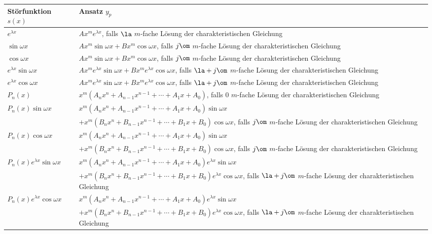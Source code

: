 \documentclass[a4paper]{article}
\begin{document}
\def\arraystretch{1.5}
\begin{tabular}{p{}|p{}}
\hline
St\"orfunktion $s(x)$ & Ansatz $y_p$ \\
\hline
$e^{\lambda x}$ & 
$Ax^me^{\lambda x}$, falls $\la$ $m$-fache L\"osung der charakteristischen Gleichung \\
$\sin \omega x$ & $Ax^m\sin \omega x+Bx^m\cos\omega x$, falls $j\om$ $m$-fache L\"osung der charakteristischen Gleichung \\
$\cos \omega x$ & $Ax^m\sin \omega x+Bx^m\cos\omega x$, falls $j\om$ $m$-fache L\"osung der charakteristischen Gleichung \\
$e^{\lambda x}\sin \omega x$ & $Ax^me^{\lambda x}\sin \omega x+Bx^me^{\lambda x}\cos\omega x$, falls $\la+j\om$ $m$-fache L\"osung der charakteristischen Gleichung \\
$e^{\lambda x}\cos \omega x$ & $Ax^me^{\lambda x}\sin \omega x+Bx^me^{\lambda x}\cos\omega x$, falls $\la+j\om$ $m$-fache L\"osung der charakteristischen Gleichung \\
$P_n(x)$ & $x^m(A_n x^{n}+A_{n-1} x^{n-1}+\cdots+A_1 x+A_0)$, falls $0$ $m$-fache L\"osung der charakteristischen Gleichung \\
$P_n(x)\sin \omega x$ & $x^m(A_n x^n+A_{n-1} x^{n-1}+\cdots+A_1 x+A_0)\sin \omega x$ \\
 & \qquad$+x^m(B_n x^n+B_{n-1} x^{n-1}+\cdots+B_1 x+B_0)\cos\omega x$, falls $j\om$ $m$-fache L\"osung der charakteristischen Gleichung \\
$P_n(x)\cos \omega x$ & $x^m(A_n x^n+A_{n-1} x^{n-1}+\cdots+A_1 x+A_0)\sin \omega x$ \\
 & \qquad$+x^m(B_n x^n+B_{n-1} x^{n-1}+\cdots+B_1 x+B_0)\cos\omega x$, falls $j\om$ $m$-fache L\"osung der charakteristischen Gleichung \\
$P_n(x)e^{\lambda x}\sin \omega x$ & $x^m(A_n x^n+A_{n-1} x^{n-1}+\cdots+A_1 x+A_0)e^{\lambda x}\sin \omega x$ \\
 & \qquad$+x^m(B_n x^n+B_{n-1} x^{n-1}+\cdots+B_1 x+B_0)e^{\lambda x}\cos\omega x$, falls $\la+j\om$ $m$-fache L\"osung der charakteristischen Gleichung \\
$P_n(x)e^{\lambda x}\cos \omega x$ & $x^m(A_n x^n+A_{n-1} x^{n-1}+\cdots+A_1 x+A_0)e^{\lambda x}\sin \omega x$ \\
 & \qquad$+x^m(B_n x^n+B_{n-1} x^{n-1}+\cdots+B_1 x+B_0)e^{\lambda x}\cos\omega x$, falls $\la+j\om$ $m$-fache L\"osung der charakteristischen Gleichung \\
\end{tabular}
\end{document}
